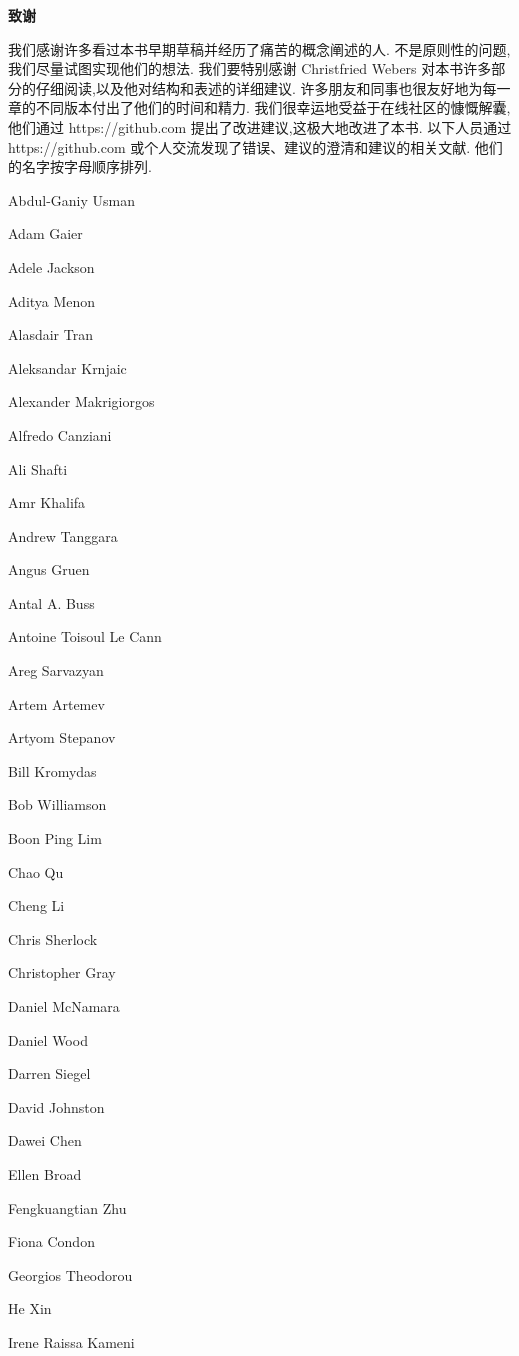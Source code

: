 \begin{center}
	\textbf{致谢}
\end{center}

我们感谢许多看过本书早期草稿并经历了痛苦的概念阐述的人. 不是原则性的问题,我们尽量试图实现他们的想法.
我们要特别感谢 Christfried Webers 对本书许多部分的仔细阅读,以及他对结构和表述的详细建议. 
许多朋友和同事也很友好地为每一章的不同版本付出了他们的时间和精力. 
我们很幸运地受益于在线社区的慷慨解囊,他们通过 https://github.com 提出了改进建议,这极大地改进了本书. 
以下人员通过 https://github.com 或个人交流发现了错误、建议的澄清和建议的相关文献. 他们的名字按字母顺序排列.

Abdul-Ganiy Usman

Adam Gaier

Adele Jackson

Aditya Menon

Alasdair Tran

Aleksandar Krnjaic

Alexander Makrigiorgos

Alfredo Canziani

Ali Shafti

Amr Khalifa

Andrew Tanggara

Angus Gruen

Antal A. Buss

Antoine Toisoul Le Cann

Areg Sarvazyan

Artem Artemev

Artyom Stepanov

Bill Kromydas

Bob Williamson

Boon Ping Lim

Chao Qu

Cheng Li

Chris Sherlock

Christopher Gray

Daniel McNamara

Daniel Wood

Darren Siegel

David Johnston

Dawei Chen

Ellen Broad

Fengkuangtian Zhu

Fiona Condon

Georgios Theodorou

He Xin

Irene Raissa Kameni

